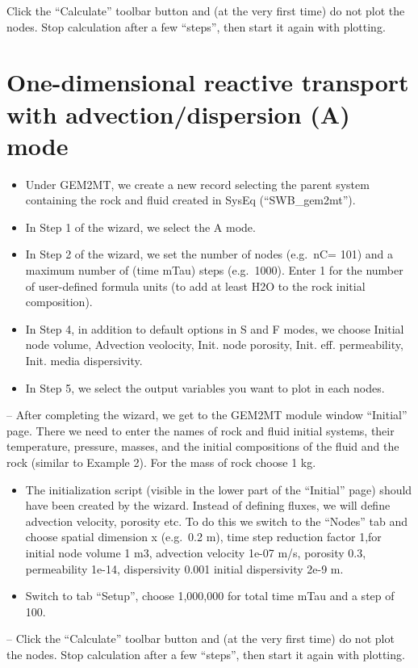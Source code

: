 \documentclass[
]{book}
\begin{document}
Click the ``Calculate'' toolbar button and (at the very first time) do not plot the nodes. Stop calculation after a few ``steps'', then start it again with plotting.

\hypertarget{one-dimensional-reactive-transport-with-advectiondispersion-a-mode}{%
\section{One-dimensional reactive transport with advection/dispersion (A) mode}\label{one-dimensional-reactive-transport-with-advectiondispersion-a-mode}}

\begin{itemize}
\item
  Under GEM2MT, we create a new record selecting the parent system containing the rock and fluid created in SysEq (``SWB\_gem2mt'').
\item
  In Step 1 of the wizard, we select the A mode.
\item
  In Step 2 of the wizard, we set the number of nodes (e.g.~nC= 101) and a maximum number of (time mTau) steps (e.g.~1000). Enter 1 for the number of user-defined formula units (to add at least H2O to the rock initial composition).
\item
  In Step 4, in addition to default options in S and F modes, we choose Initial node volume, Advection veolocity, Init. node porosity, Init. eff. permeability, Init. media dispersivity.
\item
  In Step 5, we select the output variables you want to plot in each nodes.
\end{itemize}

-- After completing the wizard, we get to the GEM2MT module window ``Initial'' page. There we need to enter the names of rock and fluid initial systems, their temperature, pressure, masses, and the initial compositions of the fluid and the rock (similar to Example 2). For the mass of rock choose 1 kg.

\begin{itemize}
\item
  The initialization script (visible in the lower part of the ``Initial'' page) should have been created by the wizard. Instead of defining fluxes, we will define advection velocity, porosity etc. To do this we switch to the ``Nodes'' tab and choose spatial dimension x (e.g.~0.2 m), time step reduction factor 1,for initial node volume 1 m3, advection velocity 1e-07 m/s, porosity 0.3, permeability 1e-14, dispersivity 0.001 initial dispersivity 2e-9 m.
\item
  Switch to tab ``Setup'', choose 1,000,000 for total time mTau and a step of 100.
\end{itemize}

-- Click the ``Calculate'' toolbar button and (at the very first time) do not plot the nodes. Stop calculation after a few ``steps'', then start it again with plotting.

  
\end{document}
